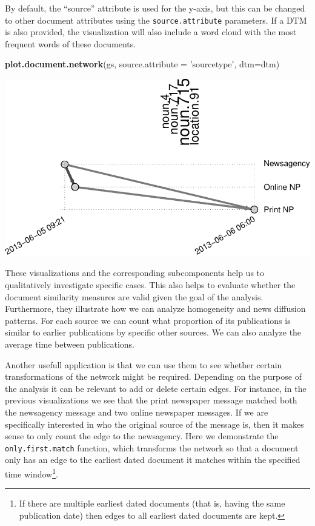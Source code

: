 \documentclass[]{article}
\newenvironment{Shaded}{\begin{snugshade}}{\end{snugshade}}
\newcommand{\KeywordTok}[1]{\textcolor[rgb]{0.13,0.29,0.53}{\textbf{{#1}}}}
\newcommand{\DataTypeTok}[1]{\textcolor[rgb]{0.13,0.29,0.53}{{#1}}}
\newcommand{\StringTok}[1]{\textcolor[rgb]{0.31,0.60,0.02}{{#1}}}
\newcommand{\NormalTok}[1]{{#1}}
\let\rmarkdownfootnote\footnote%
\def\footnote{\protect\rmarkdownfootnote}
\begin{document}
By default, the ``source'' attribute is used for the y-axis, but this
can be changed to other document attributes using the
\texttt{source.attribute} parameters. If a DTM is also provided, the
visualization will also include a word cloud with the most frequent
words of these documents.

\begin{Shaded}
\begin{Highlighting}[]
\KeywordTok{plot.document.network}\NormalTok{(gs, }\DataTypeTok{source.attribute =} \StringTok{'sourcetype'}\NormalTok{, }\DataTypeTok{dtm=}\NormalTok{dtm)}
\end{Highlighting}
\end{Shaded}

\includegraphics{vignette_files/figure-latex/unnamed-chunk-16-1.pdf}

These visualizations and the corresponding subcomponents help us to
qualitatively investigate specific cases. This also helps to evaluate
whether the document similarity measures are valid given the goal of the
analysis. Furthermore, they illustrate how we can analyze homogeneity
and news diffusion patterns. For each source we can count what
proportion of its publications is similar to earlier publications by
specific other sources. We can also analyze the average time between
publications.

Another usefull application is that we can use them to see whether
certain transformations of the network might be required. Depending on
the purpose of the analysis it can be relevant to add or delete certain
edges. For instance, in the previous visualizations we see that the
print newspaper message matched both the newsagency message and two
online newspaper messages. If we are specifically interested in who the
original source of the message is, then it makes sense to only count the
edge to the newsagency. Here we demonstrate the
\texttt{only.first.match} function, which transforms the network so that
a document only has an edge to the earliest dated document it matches
within the specified time window\footnote{If there are multiple earliest
  dated documents (that is, having the same publication date) then edges
  to all earliest dated documents are kept.}.
\end{document}
